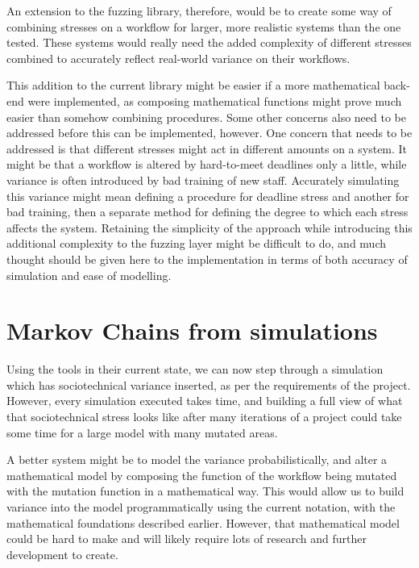 An extension to the fuzzing library, therefore, would be to create some way of combining stresses on a workflow for larger, more realistic systems than the one tested. These systems would really need the added complexity of different stresses combined to accurately reflect real-world variance on their workflows. \par

This addition to the current library might be easier if a more mathematical back-end were implemented, as composing mathematical functions might prove much easier than somehow combining procedures. Some other concerns also need to be addressed before this can be implemented, however. One concern that needs to be addressed is that different stresses might act in different amounts on a system. It might be that a workflow is altered by hard-to-meet deadlines only a little, while variance is often introduced by bad training of new staff. Accurately simulating this variance might mean defining a procedure for deadline stress and another for bad training, then a separate method for defining the degree to which each stress affects the system. Retaining the simplicity of the approach while introducing this additional complexity to the fuzzing layer might be difficult to do, and much thought should be given here to the implementation in terms of both accuracy of simulation and ease of modelling. \par

\section{Markov Chains from simulations}
\label{markov_chains}
Using the tools in their current state, we can now step through a simulation which has sociotechnical variance inserted, as per the requirements of the project. However, every simulation executed takes time, and building a full view of what that sociotechnical stress looks like after many iterations of a project could take some time for a large model with many mutated areas. \par

A better system might be to model the variance probabilistically, and alter a mathematical model by composing the function of the workflow being mutated with the mutation function in a mathematical way. This would allow us to build variance into the model programmatically using the current notation, with the mathematical foundations described earlier. However, that mathematical model could be hard to make and will likely require lots of research and further development to create. \par

